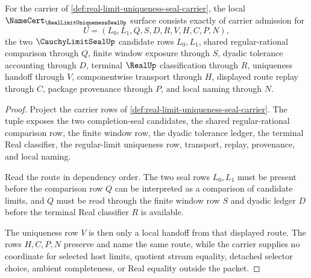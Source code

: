 \begin{theorem}
\label{thm:real-limit-uniqueness-seal-obligation-surface}
For the carrier of \autoref{def:real-limit-uniqueness-seal-carrier}, the local $\NameCert_{\RealLimitUniquenessSealUp}$ surface consists exactly of carrier admission for
$$
U=(L_0,L_1,Q,S,D,R,V,H,C,P,N),
$$
the two $\CauchyLimitSealUp$ candidate rows $L_0,L_1$, shared regular-rational comparison through $Q$, finite window exposure through $S$, dyadic tolerance accounting through $D$, terminal $\RealUp$ classification through $R$, uniqueness handoff through $V$, componentwise transport through $H$, displayed route replay through $C$, package provenance through $P$, and local naming through $N$.
\end{theorem}
\begin{proof}
Project the carrier rows of \autoref{def:real-limit-uniqueness-seal-carrier}. The tuple exposes the two completion-seal candidates, the shared regular-rational comparison row, the finite window row, the dyadic tolerance ledger, the terminal Real classifier, the regular-limit uniqueness row, transport, replay, provenance, and local naming.

Read the route in dependency order. The two seal rows $L_0,L_1$ must be present before the comparison row $Q$ can be interpreted as a comparison of candidate limits, and $Q$ must be read through the finite window row $S$ and dyadic ledger $D$ before the terminal Real classifier $R$ is available.

The uniqueness row $V$ is then only a local handoff from that displayed route. The rows $H,C,P,N$ preserve and name the same route, while the carrier supplies no coordinate for selected host limits, quotient stream equality, detached selector choice, ambient completeness, or Real equality outside the packet.
\end{proof}

